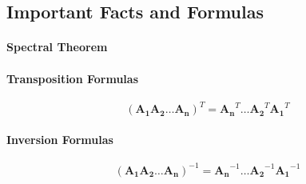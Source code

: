 %
%
%
%



\subsection{Important Facts and Formulas}

\paragraph{Spectral Theorem}

\paragraph{Transposition Formulas}
\begin{equation}
(\mathbf{A_1 A_2 \ldots  A_n})^T = \mathbf{A_n}^T \ldots \mathbf{A_2}^T \mathbf{A_1}^T
\end{equation}


\paragraph{Inversion Formulas}
\begin{equation}
(\mathbf{A_1 A_2 \ldots  A_n})^{-1} = \mathbf{A_n}^{-1} \ldots \mathbf{A_2}^{-1} \mathbf{A_1}^{-1}
\end{equation}

